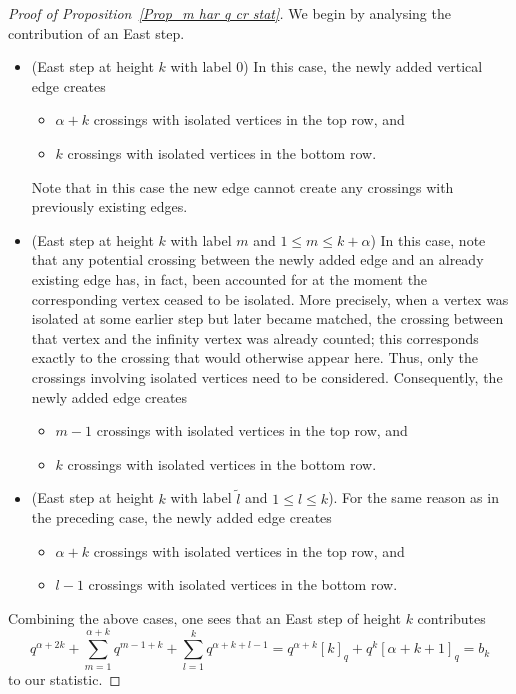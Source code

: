 \documentclass{amsart}
\theoremstyle{plain}
\theoremstyle{remark}
\numberwithin{equation}{section}
\begin{document}
\begin{proof}[Proof of Proposition~\ref{Prop_m har q cr stat}]
    
We begin by analysing the contribution of an East step.
    \begin{itemize}
        \item (East step at height $k$ with label $0$) In this case, the newly added vertical edge creates
    \begin{itemize}
        \item $\alpha + k$ crossings with isolated vertices in the top row, and
        \item $k$ crossings with isolated vertices in the bottom row.
    \end{itemize}
    Note that in this case the new edge cannot create any crossings with previously existing edges.
        \smallskip 
        \item (East step at height $k$ with label $m$ and $1 \le m \le k+\alpha$) In this case, note that any potential crossing between the newly added edge and an already existing edge has, in fact, been accounted for at the moment the corresponding vertex ceased to be isolated.  
    More precisely, when a vertex was isolated at some earlier step but later became matched, the crossing between that vertex and the infinity vertex was already counted; this corresponds exactly to the crossing that would otherwise appear here.  
    Thus, only the crossings involving isolated vertices need to be considered.  
    Consequently, the newly added edge creates
    \begin{itemize}
        \item $m - 1$ crossings with isolated vertices in the top row, and
        \item $k$ crossings with isolated vertices in the bottom row.
    \end{itemize}
    \smallskip
        \item (East step at height $k$ with label $\widetilde{l}$ and $1 \le l \le k$). For the same reason as in the preceding case, the newly added edge creates
    \begin{itemize}
        \item $\alpha + k$ crossings with isolated vertices in the top row, and
        \item $l - 1$ crossings with isolated vertices in the bottom row.
    \end{itemize}
    \end{itemize}
   Combining the above cases, one sees that an East step of height $k$ contributes
    \begin{equation*}
        q^{\alpha+2k}+\sum_{m=1}^{\alpha+k}q^{m-1+k}+\sum_{l=1}^{k}q^{\alpha+k+l -1}
        =q^{\alpha+k}[k]_{q}+q^{k}[\alpha+k+1]_{q}=b_k
    \end{equation*}
    to our statistic.
    

\end{proof}
\end{document}
